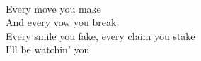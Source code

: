 \\
Every move you make \\
And every vow you break \\
Every smile you fake, every claim you stake \\
I'll be watchin' you \\
